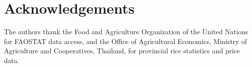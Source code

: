 \documentclass[fleqn,10pt]{olplainarticle}
\begin{document}
\section*{Acknowledgements}

The authors thank the Food and Agriculture Organization of the United Nations
for FAOSTAT data access, and the Office of Agricultural Economics, Ministry of
Agriculture and Cooperatives, Thailand, for provincial rice statistics and
price data.


\end{document}
